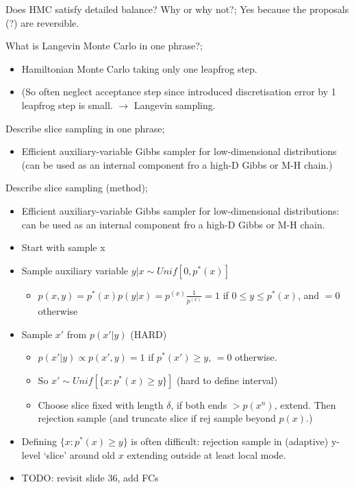 \documentclass{article}
\begin{document}
Does HMC satisfy detailed balance? Why or why not?; Yes because the proposals (?) are reversible.

What is Langevin Monte Carlo in one phrase?; \begin{itemize}
    \item Hamiltonian Monte Carlo taking only one leapfrog step.
    \item (So often neglect acceptance step since introduced discretisation error by 1 leapfrog step is small. $\to$ Langevin sampling.
\end{itemize} 

Describe slice sampling in one phrase; \begin{itemize}
    \item Efficient auxiliary-variable Gibbs sampler for low-dimensional distributions (can be used as an internal component fro a high-D Gibbs or M-H chain.)
\end{itemize}

Describe slice sampling (method); \begin{itemize}
    \item Efficient auxiliary-variable Gibbs sampler for low-dimensional distributions: can be used as an internal component fro a high-D Gibbs or M-H chain.
    \item Start with sample x
    \item Sample auxiliary variable $y|x \sim Unif[0, p^*(x)]$
    \begin{itemize}
        \item $p(x, y) = p^*(x)p(y|x) = p^(x)\frac{1}{p^(x)}=1$ if $0\leq y \leq p^*(x)$, and $=0$ otherwise
    \end{itemize}
    \item Sample $x'$ from $p(x'|y)$ (HARD)
    \begin{itemize}
        \item $p(x'|y) \propto p(x',y) = 1$ if $p^*(x') \geq y$, $=0$ otherwise.
        \item So $x' \sim Unif[\{x: p^*(x) \geq y\} ]$ (hard to define interval)
        \item Choose slice fixed with length $\delta$, if both ends $> p(x^n)$, extend. Then rejection sample (and truncate slice if rej sample beyond $p(x)$.)
    \end{itemize}
    \item Defining $\{x:p^*(x)\geq y \}$ is often difficult: rejection sample in (adaptive) y-level `slice' around old $x$ extending outside at least local mode.
    \item TODO: revisit slide 36, add FCs
\end{itemize}
\end{document}
